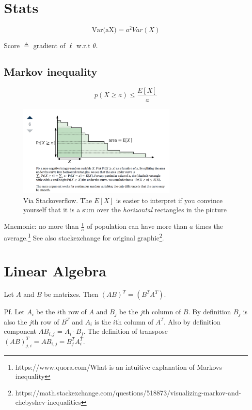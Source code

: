 \documentclass[12pt]{amsart}
\title{}
\author{}
\date{} %
\begin{document}
\maketitle
\tableofcontents

\section{Stats}

$$
\text{Var(aX)} = a^2 Var(X)
$$

Score $\triangleq$ gradient of $\ell$ w.r.t  $\theta$.

\subsection{Markov inequality}

$$p(X\geq a) \leq \frac{E[X]}{a}$$

\begin{figure}[h]
\centering
\includegraphics[width=8cm]{markov.png}
\caption{Via Stackoverflow. The $E[X]$ is easier to interpret if you convince yourself that it is a sum over the \textit{horizontal} rectangles in the picture}
\end{figure}



Mnemonic: no more than $\frac{1}{a}$ of population can have more than $a$ times the average.\footnote{https://www.quora.com/What-is-an-intuitive-explanation-of-Markovs-inequality} See also stackexchange for original graphic\footnote{https://math.stackexchange.com/questions/518873/visualizing-markov-and-chebyshev-inequalities}.

\section{Linear Algebra}

Let $A$ and $B$ be matrixes. Then $(AB)^T$ = $(B^T A^T)$. 

Pf. Let $A_i$ be the $i$th row of $A$ and $B_j$ be the $j$th column of $B$.  By definition $B_j$ is also the $j$th row of $B^T$ and $A_i$ is the $i$th column of $A^T$. Also by definition component $AB_{i,j}$ = $A_i \cdot B_j$. The definition of transpose $(AB)^T_{j,i} = AB_{i,j} = B^T_{j}A^T_i$.
\end{document}
